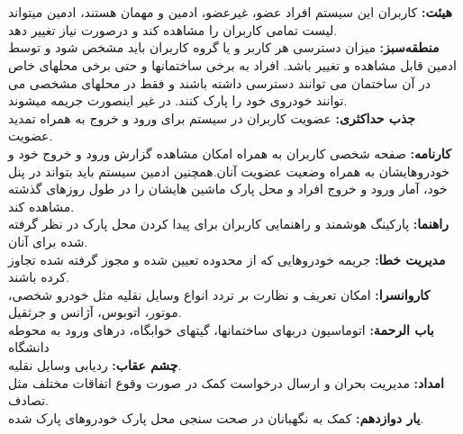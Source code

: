 \documentclass[oneside,a4paper,12pt]{book}
\begin{document}
	\section{}
	\noindent
	\textbf{هيئت:}
	کاربران این سیستم افراد عضو، غیرعضو، ادمین و مهمان هستند، ادمین میتواند لیست تمامی کاربران را مشاهده کند و درصورت نیاز تغییر دهد.\\
	
	\noindent
	\textbf{منطقه‌سبز:} 
	میزان دسترسی هر کاربر و یا گروه کاربران باید مشخص شود و توسط ادمین قابل مشاهده و تغییر باشد. افراد به برخی ساختمانها و حتی برخی محلهای خاص در آن ساختمان می توانند دسترسی داشته باشند و فقط در محلهای مشخصی می توانند خودروی خود را پارک کنند. در غیر اینصورت جریمه میشوند.\\
	
	\noindent
	\textbf{جذب حداكثری:} 
	عضویت کاربران در سیستم برای ورود و خروج به همراه تمدید عضویت.\\
	
	\noindent
	\textbf{كارنامه:}
	صفحه شخصی کاربران به همراه امکان مشاهده گزارش ورود و خروج خود و خودروهایشان به همراه وضعیت عضویت آنان.همچنین ادمین سیستم باید بتواند در پنل خود، آمار ورود و خروج افراد و محل پارک ماشین هایشان را در طول روزهای گذشته مشاهده کند.\\
	
	\noindent
	\textbf{راهنما:}
	پارکینگ هوشمند و راهنمایی کاربران برای پیدا کردن محل پارک در نظر گرفته شده برای آنان.\\
	
	\noindent
	\textbf{مديريت خطا:}
	جریمه خودروهایی که از محدوده تعیین شده و مجوز گرفته شده تجاوز کرده باشند.\\
	
	\noindent
	\textbf{كاروانسرا:}
	امکان تعریف و نظارت بر تردد انواع وسایل نقلیه مثل خودرو شخصی، موتور، اتوبوس، آژانس و جرثقیل.\\
	
	\noindent
	\textbf{باب الرحمة:}
	اتوماسیون دربهای ساختمانها، گیتهای خوابگاه، درهای ورود به محوطه دانشگاه\\
	
	\noindent
	\textbf{چشم عقاب:}
	ردیابی وسایل نقلیه.\\
	
	\noindent
	\textbf{امداد:}
	مدیریت بحران و ارسال درخواست کمک در صورت وقوع اتفاقات مختلف مثل تصادف.\\
	
	\noindent
	\textbf{يار دوازدهم:}
	کمک به نگهبانان در صحت سنجی محل پارک خودروهای پارک شده.
	
\end{document}
